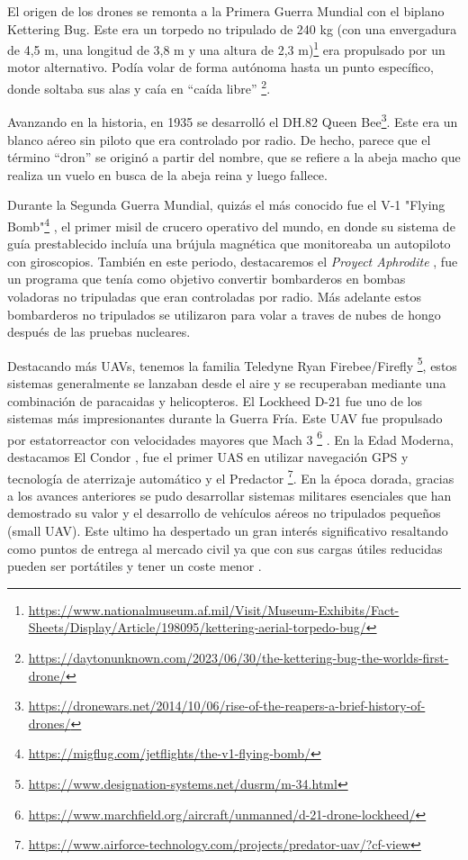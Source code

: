 El origen de los drones se remonta a la Primera Guerra Mundial con el biplano Kettering Bug.
Este era un torpedo no tripulado de 240 kg (con una envergadura de 4,5 m, una longitud de
3,8 m y una altura de 2,3 m)\footnote{\url{https://www.nationalmuseum.af.mil/Visit/Museum-Exhibits/Fact-Sheets/Display/Article/198095/kettering-aerial-torpedo-bug/}} era propulsado por un motor alternativo. Podía volar de
forma autónoma hasta un punto específico, donde soltaba sus alas y caía en “caída libre” \footnote{\url{https://daytonunknown.com/2023/06/30/the-kettering-bug-the-worlds-first-drone/}}.\newline

Avanzando en la historia, en 1935 se desarrolló el DH.82 Queen Bee\footnote{\url{https://dronewars.net/2014/10/06/rise-of-the-reapers-a-brief-history-of-drones/}}. Este era un blanco aéreo sin piloto que era controlado por radio. De hecho, parece que el término “dron” se originó a partir del nombre, que se refiere a la abeja macho que realiza un vuelo en busca de la abeja reina y luego fallece. \newline

Durante la Segunda Guerra Mundial, quizás el más conocido fue el V-1 "Flying Bomb"\footnote{\url{https://migflug.com/jetflights/the-v1-flying-bomb/}} , el primer misil
de crucero operativo del mundo, en donde su sistema de guía prestablecido incluía una brújula magnética que monitoreaba un autopiloto con giroscopios. También en este periodo, destacaremos el \textit{Proyect Aphrodite} \cite{Aphrodite}, fue un programa que tenía como objetivo convertir bombarderos en bombas voladoras no tripuladas que eran controladas por radio. Más adelante estos bombarderos no tripulados se utilizaron para volar a traves de nubes de hongo
después de las pruebas nucleares. \newline

Destacando más UAVs, tenemos la familia Teledyne Ryan Firebee/Firefly \footnote{\url{https://www.designation-systems.net/dusrm/m-34.html}}, estos sistemas generalmente se lanzaban 
desde el aire y se recuperaban mediante una combinación de paracaidas y helicopteros. El Lockheed D-21 fue uno de los sistemas más impresionantes durante la Guerra Fría. 
Este UAV fue propulsado por estatorreactor con velocidades mayores que Mach 3 \footnote{\url{https://www.marchfield.org/aircraft/unmanned/d-21-drone-lockheed/}} . 
En la Edad Moderna, destacamos El Condor \cite{CondorUAV}, fue el primer UAS en utilizar navegación GPS y tecnología de aterrizaje automático y el Predactor \footnote{\url{https://www.airforce-technology.com/projects/predator-uav/?cf-view}}. 
En la época dorada, gracias a los avances anteriores se pudo desarrollar sistemas militares esenciales que han demostrado su valor y el desarrollo de vehículos aéreos no 
tripulados pequeños (small UAV). Este ultimo ha despertado un gran interés significativo resaltando como puntos de entrega al mercado civil ya que con sus cargas útiles
reducidas pueden ser portátiles y tener un coste menor . \newline

